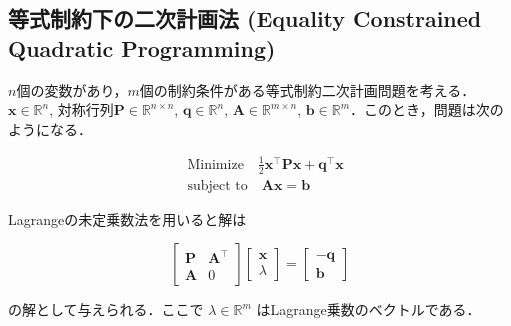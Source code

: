 \subsection{等式制約下の二次計画法 (Equality Constrained Quadratic Programming)}

$n$個の変数があり，$m$個の制約条件がある等式制約二次計画問題を考える．$\mathbf {x}\in \mathbb{R}^n$, 対称行列$\mathbf{P}\in \mathbb{R}^{n\times n}$,  $\mathbf {q}\in \mathbb{R}^{n}$, $\mathbf{A}\in \mathbb{R}^{m\times n}$, $\mathbf {b}\in \mathbb{R}^m$．このとき，問題は次のようになる．

$$
\begin{align}
&{\text{Minimize}}\quad {\frac {1}{2}}\mathbf {x}^\top \mathbf{P}\mathbf {x} +\mathbf {q} ^{\top}\mathbf {x}\\
&{\text{subject to}}\quad \mathbf{A}\mathbf {x} =\mathbf {b}
\end{align}
$$

Lagrangeの未定乗数法を用いると解は

$$
{\begin{bmatrix}\mathbf{P}&\mathbf{A}^\top\\\mathbf{A}&0\end{bmatrix}}{\begin{bmatrix}\mathbf {x} \\
\lambda \end{bmatrix}}={\begin{bmatrix}-\mathbf {q} \\\mathbf {b} \end{bmatrix}}
$$

の解として与えられる．ここで $\lambda \in \mathbb{R}^{m}$  はLagrange乗数のベクトルである．
